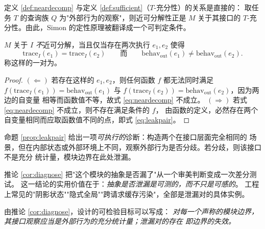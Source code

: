 定义 \ref{def:neardecomp} 与定义 \ref{def:sufficient}（$T$-充分性）的关系是直接的：
取任务 $T$ 的查询族 $Q$ 为"外部行为的观察"，则近可分解性正是 $M$ 关于其接口的
$T$-充分性。由此，Simon 的定性原理被翻译成一个可判定条件。

\begin{proposition}[泄漏对]\label{prop:leakpair}
$M$ 关于 $I$ \emph{不}近可分解，当且仅当存在两次执行 $e_1, e_2$ 使得
\begin{equation}\label{eq:leakpair}
\mathrm{trace}_I(e_1) = \mathrm{trace}_I(e_2)
\qquad\text{而}\qquad
\mathrm{behav}_{\mathrm{out}}(e_1) \ne \mathrm{behav}_{\mathrm{out}}(e_2).
\end{equation}
称这样的一对为。
\end{proposition}

\begin{proof}
$(\Leftarrow)$ 若存在这样的 $e_1, e_2$，则任何函数 $f$ 都无法同时满足
$f(\mathrm{trace}_I(e_1)) = \mathrm{behav}_{\mathrm{out}}(e_1)$ 与
$f(\mathrm{trace}_I(e_2)) = \mathrm{behav}_{\mathrm{out}}(e_2)$，因为两边的自变量
相等而函数值不等，故式 \eqref{eq:neardecomp} 不成立。
$(\Rightarrow)$ 若式 \eqref{eq:neardecomp} 不成立，则不存在满足条件的 $f$，
由函数的定义，必然存在两个自变量相同而应取函数值不同的点，即式 \eqref{eq:leakpair}。
\end{proof}

\begin{corollary}[诊断程序]\label{cor:diagnose}
命题 \ref{prop:leakpair} 给出一项\emph{可执行的}诊断：构造两个在接口层面完全相同的
场景，但在内部状态或外部环境上不同，观察外部行为是否分歧。若分歧，则该接口不是充分
统计量，模块边界在此处泄漏。
\end{corollary}

推论 \ref{cor:diagnose} 把"这个模块的抽象是否漏了"从一个审美判断变成一次差分测试。
这一结论的实用价值在于：\emph{抽象是否泄漏是可测的，而不只是可感的}。
工程上常见的"阴影状态""隐式全局""跨请求缓存污染"，全部是泄漏对的具体实例。

\begin{principle}[设计的等价目标]\label{pr:design-eq}
由推论 \ref{cor:diagnose}，设计的可检验目标可以写成：
\emph{对每一个声称的模块边界，其接口观察应当是外部行为的充分统计量；泄漏对的存在
即边界的失效。}
\end{principle}


